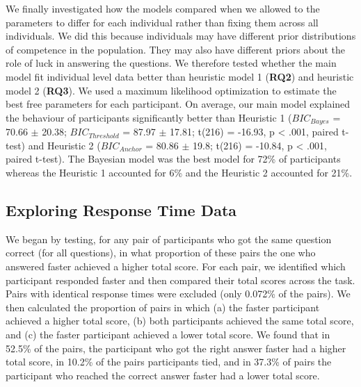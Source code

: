 \documentclass[
  10pt,
  letterpaper]{article}
\begin{document}
We finally investigated how the models compared when we allowed to the parameters to differ for each individual rather than fixing them across all individuals. We did this because individuals may have different prior distributions of competence in the population. They may also have different priors about the role of luck in answering the questions. We therefore tested whether the main model fit individual level data better than heuristic model 1 (\textbf{RQ2}) and heuristic model 2 (\textbf{RQ3}). We used a maximum likelihood optimization to estimate the best free parameters for each participant. On average, our main model explained the behaviour of participants significantly better than Heuristic 1 (\(BIC_{Bayes}\) = 70.66 \(\pm\) 20.38; \(BIC_{Threshold}\) = 87.97 \(\pm\) 17.81; t(216) = -16.93, p \textless{} .001, paired t-test) and Heuristic 2 (\(BIC_{Anchor}\) = 80.86 \(\pm\) 19.8; t(216) = -10.84, p \textless{} .001, paired t-test). The Bayesian model was the best model for 72\% of participants whereas the Heuristic 1 accounted for 6\% and the Heuristic 2 accounted for 21\%.

\subsection{Exploring Response Time Data}\label{exploring-response-time-data}

We began by testing, for any pair of participants who got the same question correct (for all questions), in what proportion of these pairs the one who answered faster achieved a higher total score. For each pair, we identified which participant responded faster and then compared their total scores across the task. Pairs with identical response times were excluded (only 0.072\% of the pairs). We then calculated the proportion of pairs in which (a) the faster participant achieved a higher total score, (b) both participants achieved the same total score, and (c) the faster participant achieved a lower total score. We found that in 52.5\% of the pairs, the participant who got the right answer faster had a higher total score, in 10.2\% of the pairs participants tied, and in 37.3\% of pairs the participant who reached the correct answer faster had a lower total score.
\end{document}
